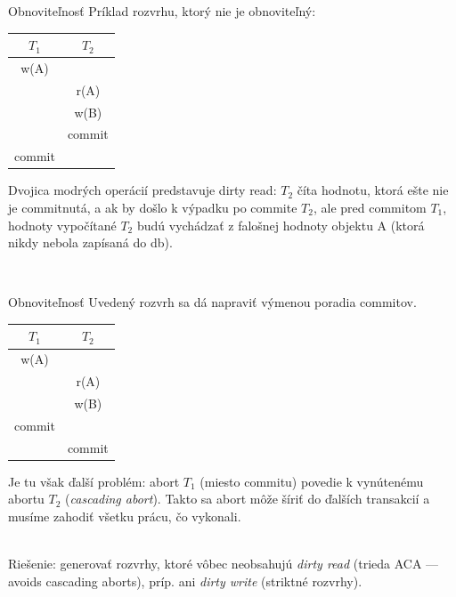 \documentclass[12pt]{beamer}
\def\blue#1{\textcolor{Cerulean}{#1}}
\begin{document}
\begin{frame}[fragile]{Obnoviteľnosť}
Príklad rozvrhu, ktorý \alert{nie je obnoviteľný}:\\[5mm]
\begin{minipage}{.4\pdfpagewidth}
\begin{tabular}{c|c}
  $T_1$         & $T_2$        \\\hline\hline
  \blue{w(A)}   &              \\\hline
                & \blue{r(A)}  \\\hline
                & w(B)         \\\hline
                & commit       \\\hline
  commit        &              \\
\end{tabular}
\end{minipage}
\begin{minipage}{.4\pdfpagewidth}
Dvojica modrých operácií predstavuje \alert{dirty read}:
$T_2$ číta hodnotu, ktorá ešte nie je commitnutá, a ak by došlo k výpadku po commite $T_2$, ale pred commitom $T_1$,
hodnoty vypočítané $T_2$ budú vychádzať z falošnej hodnoty objektu A (ktorá nikdy nebola zapísaná do db).
\end{minipage}
\\[12mm]
\end{frame}


\begin{frame}[fragile]{Obnoviteľnosť}
Uvedený rozvrh sa dá napraviť výmenou poradia commitov.\\[5mm]
\begin{minipage}{.4\pdfpagewidth}
\begin{tabular}{c|c}
  $T_1$         & $T_2$        \\\hline\hline
  \blue{w(A)}   &              \\\hline
                & \blue{r(A)}  \\\hline
                & w(B)         \\\hline
  commit        &              \\\hline
                & commit       \\
\end{tabular}
\end{minipage}
\begin{minipage}{.4\pdfpagewidth}
Je tu však ďalší problém: abort $T_1$ (miesto commitu) povedie k vynútenému abortu $T_2$ (\emph{cascading abort}).
Takto sa abort môže šíriť do ďalších transakcií a musíme zahodiť všetku prácu, čo vykonali.
\end{minipage}
\\[5mm]
Riešenie: generovať rozvrhy, ktoré vôbec neobsahujú \emph{dirty read} (trieda ACA --- avoids cascading aborts),
príp. ani \emph{dirty write} (\alert{striktné} rozvrhy).
\end{frame}
\end{document}
